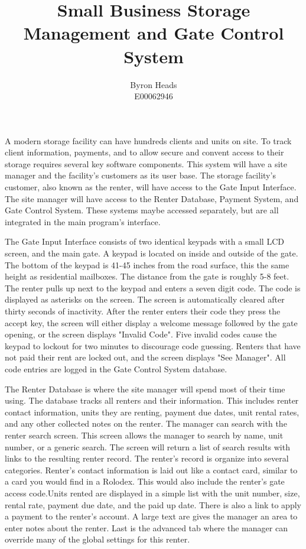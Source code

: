\documentclass[a4paper,12pt]{report}
\title{Small Business Storage Management and Gate Control System}
\author{Byron Heads \\
		E00062946}
\begin{document}
\maketitle

A modern storage facility can have hundreds clients and units on site.  To track client information, payments, and to allow secure and convent access to their storage requires several key software components.  This system will have a site manager and the facility's customers as its user base.  The storage facility's customer, also known as the renter, will have access to the Gate Input Interface.  The site manager will have access to the Renter Database, Payment System, and Gate Control System.  These systems maybe accessed separately, but are all integrated in the main program's interface.

The Gate Input Interface consists of two identical keypads with a small LCD screen, and the main gate.  A keypad is located on inside and outside of the gate.  The bottom of the keypad is 41-45 inches from the road surface, this the same height as residential mailboxes.  The distance from the gate is roughly 5-8 feet.  The renter pulls up next to the keypad and enters a seven digit code.  The code is displayed as asterisks on the screen.  The screen is automatically cleared after thirty seconds of inactivity.  After the renter enters their code they press the accept key, the screen will either display a welcome message followed by the gate opening, or the screen displays "Invalid Code".  Five invalid codes cause the keypad to lockout for two minutes to discourage code guessing.  Renters that have not paid their rent are locked out, and the screen displays "See Manager". All code entries are logged in the Gate Control System database.

The Renter Database is where the site manager will spend most of their time using.  The database tracks all renters and their information.  This includes renter contact information, units they are renting, payment due dates, unit rental rates, and any other collected notes on the renter.  The manager can search with the renter search screen.  This screen allows the manager to search by name, unit number, or a generic search.  The screen will return a list of search results with links to the resulting renter record.  The renter's record is organize into several categories.  Renter's contact information is laid out like a contact card, similar to a card you would find in a Rolodex.  This would also include the renter's gate access code.Units rented are displayed in a simple list with the unit number, size, rental rate, payment due date, and the paid up date.  There is also a link to apply a payment to the renter's account.  A large text are gives the manager an area to enter notes about the renter.  Last is the advanced tab where the manager can override many of the global settings for this renter.
\end{document}
